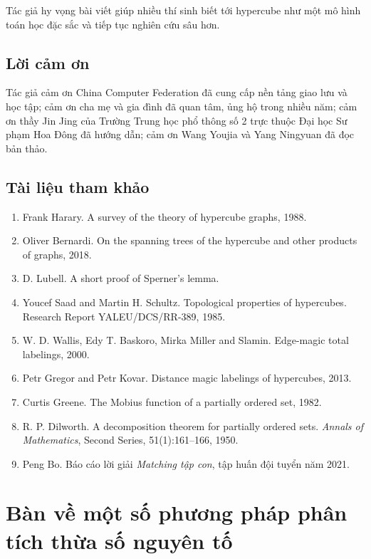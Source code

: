 \documentclass[11pt]{article}
\begin{document}
Tác giả hy vọng bài viết giúp nhiều thí sinh biết tới hypercube như một mô
hình toán học đặc sắc và tiếp tục nghiên cứu sâu hơn.

\subsection{Lời cảm ơn}

Tác giả cảm ơn China Computer Federation đã cung cấp nền tảng giao lưu và học
tập; cảm ơn cha mẹ và gia đình đã quan tâm, ủng hộ trong nhiều năm; cảm ơn
thầy Jin Jing của Trường Trung học phổ thông số 2 trực thuộc Đại học Sư phạm
Hoa Đông đã hướng dẫn; cảm ơn Wang Youjia và Yang Ningyuan đã đọc bản thảo.

\subsection{Tài liệu tham khảo}

\begin{enumerate}
  \item Frank Harary. A survey of the theory of hypercube graphs, 1988.
  \item Oliver Bernardi. On the spanning trees of the hypercube and other
  products of graphs, 2018.
  \item D. Lubell. A short proof of Sperner's lemma.
  \item Youcef Saad and Martin H. Schultz. Topological properties of
  hypercubes. Research Report YALEU/DCS/RR-389, 1985.
  \item W. D. Wallis, Edy T. Baskoro, Mirka Miller and Slamin. Edge-magic total
  labelings, 2000.
  \item Petr Gregor and Petr Kovar. Distance magic labelings of hypercubes,
  2013.
  \item Curtis Greene. The Mobius function of a partially ordered set, 1982.
  \item R. P. Dilworth. A decomposition theorem for partially ordered sets.
  \emph{Annals of Mathematics}, Second Series, 51(1):161--166, 1950.
  \item Peng Bo. Báo cáo lời giải \emph{Matching tập con}, tập huấn đội tuyển
  năm 2021.
\end{enumerate}

\section{Bàn về một số phương pháp phân tích thừa số nguyên tố}
\end{document}
